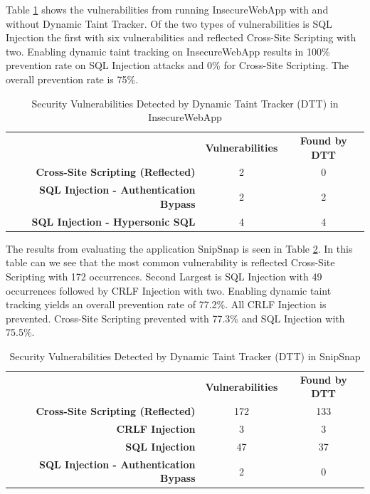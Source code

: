 Table \ref{table:InsecureTable} shows the vulnerabilities from running InsecureWebApp \parencite{insecure} with and without Dynamic Taint Tracker. Of the two types of vulnerabilities is SQL Injection the first with six vulnerabilities and reflected Cross-Site Scripting with two. Enabling dynamic taint tracking on InsecureWebApp \parencite{insecure} results in 100\% prevention rate on SQL Injection attacks and 0\% for Cross-Site Scripting. The overall prevention rate is 75\%. 

\begin{table}[H]
  \centering
  \caption{Security Vulnerabilities Detected by Dynamic Taint Tracker (DTT) in InsecureWebApp}
  \label{table:InsecureTable}
    \begin{tabular}{rcc}
      & \textbf{Vulnerabilities} & \textbf{Found by DTT} \\
      \textbf{Cross-Site Scripting (Reflected)}      & 2             & 0  \\
      \textbf{SQL Injection - Authentication Bypass} & 2             & 2  \\
      \textbf{SQL Injection - Hypersonic SQL}        & 4             & 4  
    \end{tabular}
\end{table}

The results from evaluating the application SnipSnap \parencite{snipsnap} is seen in Table \ref{table:SnipSnapTable}. In this table can we see that the most common vulnerability is reflected Cross-Site Scripting with 172 occurrences. Second Largest is SQL Injection with 49 occurrences followed by CRLF Injection with two. Enabling dynamic taint tracking yields an overall prevention rate of 77.2\%. All CRLF Injection is prevented. Cross-Site Scripting prevented with 77.3\% and SQL Injection with 75.5\%.

\begin{table}[H]
  \centering
  \caption{Security Vulnerabilities Detected by Dynamic Taint Tracker (DTT) in SnipSnap}
  \label{table:SnipSnapTable}
  \begin{tabular}{rcc}
    & \textbf{Vulnerabilities} & \textbf{Found by DTT} \\
    \textbf{Cross-Site Scripting (Reflected)}      & 172           & 133  \\
    \textbf{CRLF Injection}                        & 3             & 3    \\
    \textbf{SQL Injection}                         & 47            & 37   \\
    \textbf{SQL Injection - Authentication Bypass} & 2             & 0       
  \end{tabular}
\end{table}

